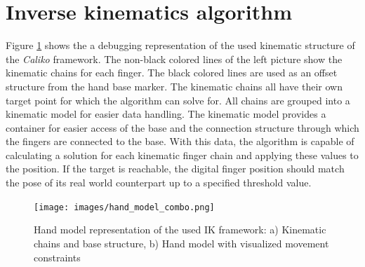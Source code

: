 \section{Inverse kinematics algorithm}
Figure \ref{img:hand-constraint_debug_view} shows the a debugging representation of the used kinematic structure of the \textit{Caliko} framework. The non-black colored lines of the left picture show the kinematic chains for each finger. The black colored lines are used as an offset structure from the hand base marker.
The kinematic chains all have their own target point for which the algorithm can solve for. All chains are grouped into a kinematic model for easier data handling. The kinematic model provides a container for easier access of the base and the connection structure through which the fingers are connected to the base.
With this data, the algorithm is capable of calculating a solution for each kinematic finger chain and applying these values to the position. If the target is reachable, the digital finger position should match the pose of its real world counterpart up to a specified threshold value.
\begin{figure}[H]
\centering
\texttt{[image: images/hand\_model\_combo.png]}
\caption{Hand model representation of the used IK framework: a) Kinematic chains and base structure, b) Hand model with visualized movement constraints}
\label{img:hand-constraint_debug_view} 
\end{figure}
